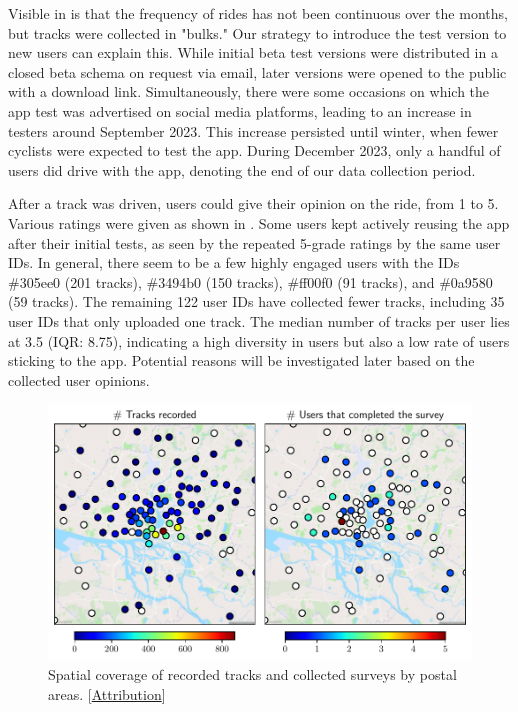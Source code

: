 Visible in  is that the frequency of rides has not been continuous over the months, but tracks were collected in "bulks." Our strategy to introduce the test version to new users can explain this. While initial beta test versions were distributed in a closed beta schema on request via email, later versions were opened to the public with a download link. Simultaneously, there were some occasions on which the app test was advertised on social media platforms, leading to an increase in testers around September 2023. This increase persisted until winter, when fewer cyclists were expected to test the app. During December 2023, only a handful of users did drive with the app, denoting the end of our data collection period. 

After a track was driven, users could give their opinion on the ride, from 1 to 5. Various ratings were given as shown in . Some users kept actively reusing the app after their initial tests, as seen by the repeated 5-grade ratings by the same user IDs. In general, there seem to be a few highly engaged users with the IDs \#305ee0 (201 tracks), \#3494b0 (150 tracks), \#ff00f0 (91 tracks), and \#0a9580 (59 tracks). The remaining 122 user IDs have collected fewer tracks, including 35 user IDs that only uploaded one track. The median number of tracks per user lies at 3.5 (IQR: 8.75), indicating a high diversity in users but also a low rate of users sticking to the app. Potential reasons will be investigated later based on the collected user opinions.

\begin{figure}[t]
\caption{Spatial coverage of recorded tracks and collected surveys by postal areas. [\hyperref[attribution]{Attribution}]}\label{fig:app-spatial-distribution}
\includegraphics[width=\linewidth]{images/app-spatial-distribution.pdf}
\end{figure}

